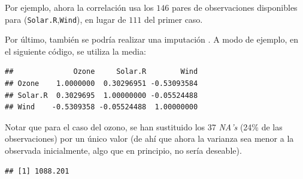\documentclass[
]{book}
\newenvironment{Shaded}{\begin{snugshade}}{\end{snugshade}}
\newcommand{\AttributeTok}[1]{\textcolor[rgb]{0.13,0.29,0.53}{#1}}
\newcommand{\DecValTok}[1]{\textcolor[rgb]{0.00,0.00,0.81}{#1}}
\newcommand{\FunctionTok}[1]{\textcolor[rgb]{0.13,0.29,0.53}{\textbf{#1}}}
\newcommand{\NormalTok}[1]{#1}
\newcommand{\OtherTok}[1]{\textcolor[rgb]{0.56,0.35,0.01}{#1}}
\newcommand{\SpecialCharTok}[1]{\textcolor[rgb]{0.81,0.36,0.00}{\textbf{#1}}}
\theoremstyle{break}
\theoremstyle{nonumberplain}
\begin{document}
Por ejemplo, ahora la correlación usa los \(146\) pares de observaciones disponibles para (\texttt{Solar.R},\texttt{Wind}), en lugar de \(111\) del primer caso.

Por último, también se podría realizar una imputación \citep{van2018flexible}. A modo de ejemplo, en el siguiente código, se utiliza la media:

\begin{Shaded}
\end{Shaded}

\begin{verbatim}
##              Ozone     Solar.R        Wind
## Ozone    1.0000000  0.30296951 -0.53093584
## Solar.R  0.3029695  1.00000000 -0.05524488
## Wind    -0.5309358 -0.05524488  1.00000000
\end{verbatim}

Notar que para el caso del ozono, se han sustituido los 37 \emph{NA's} (24\% de las observaciones) por un único valor (de ahí que ahora la varianza sea menor a la observada inicialmente, algo que en principio, no sería deseable).

\begin{Shaded}
\end{Shaded}

\begin{verbatim}
## [1] 1088.201
\end{verbatim}

\begin{Shaded}
\end{Shaded}
\end{document}
